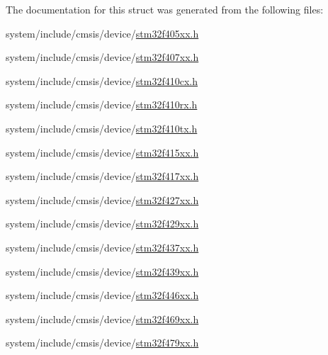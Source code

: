 The documentation for this struct was generated from the following files\+:\begin{DoxyCompactItemize}
\item 
system/include/cmsis/device/\hyperlink{stm32f405xx_8h}{stm32f405xx.\+h}\item 
system/include/cmsis/device/\hyperlink{stm32f407xx_8h}{stm32f407xx.\+h}\item 
system/include/cmsis/device/\hyperlink{stm32f410cx_8h}{stm32f410cx.\+h}\item 
system/include/cmsis/device/\hyperlink{stm32f410rx_8h}{stm32f410rx.\+h}\item 
system/include/cmsis/device/\hyperlink{stm32f410tx_8h}{stm32f410tx.\+h}\item 
system/include/cmsis/device/\hyperlink{stm32f415xx_8h}{stm32f415xx.\+h}\item 
system/include/cmsis/device/\hyperlink{stm32f417xx_8h}{stm32f417xx.\+h}\item 
system/include/cmsis/device/\hyperlink{stm32f427xx_8h}{stm32f427xx.\+h}\item 
system/include/cmsis/device/\hyperlink{stm32f429xx_8h}{stm32f429xx.\+h}\item 
system/include/cmsis/device/\hyperlink{stm32f437xx_8h}{stm32f437xx.\+h}\item 
system/include/cmsis/device/\hyperlink{stm32f439xx_8h}{stm32f439xx.\+h}\item 
system/include/cmsis/device/\hyperlink{stm32f446xx_8h}{stm32f446xx.\+h}\item 
system/include/cmsis/device/\hyperlink{stm32f469xx_8h}{stm32f469xx.\+h}\item 
system/include/cmsis/device/\hyperlink{stm32f479xx_8h}{stm32f479xx.\+h}\end{DoxyCompactItemize}

